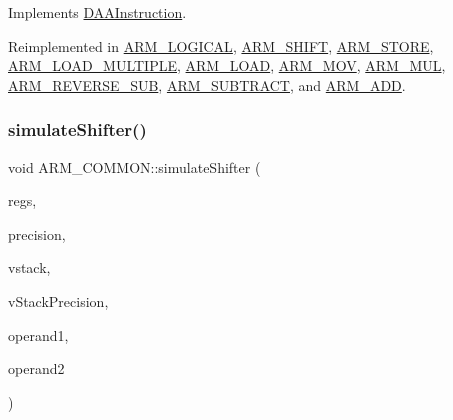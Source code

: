 Implements \hyperlink{classDAAInstruction_a61d0b9bece1e0ead89a46c0197276324}{D\+A\+A\+Instruction}.



Reimplemented in \hyperlink{classARM__LOGICAL_a6359a7daad8f3ddbe314a378e030bf1b}{A\+R\+M\+\_\+\+L\+O\+G\+I\+C\+AL}, \hyperlink{classARM__SHIFT_a0438bca8496243c4067bb1ec24abeab4}{A\+R\+M\+\_\+\+S\+H\+I\+FT}, \hyperlink{classARM__STORE_a0db5283c3bda82c617f3d2e541ad0982}{A\+R\+M\+\_\+\+S\+T\+O\+RE}, \hyperlink{classARM__LOAD__MULTIPLE_a77db594a9b9127619da39e047a12ba41}{A\+R\+M\+\_\+\+L\+O\+A\+D\+\_\+\+M\+U\+L\+T\+I\+P\+LE}, \hyperlink{classARM__LOAD_a905a6e8a6154825f9dc739cabfdb148d}{A\+R\+M\+\_\+\+L\+O\+AD}, \hyperlink{classARM__MOV_acbf1dba49a5e4d834e41d5e834ff7e5a}{A\+R\+M\+\_\+\+M\+OV}, \hyperlink{classARM__MUL_a57f827247b5ee156334e9963b3c6bfd4}{A\+R\+M\+\_\+\+M\+UL}, \hyperlink{classARM__REVERSE__SUB_a0606f63f3d08541627b5758675ca052c}{A\+R\+M\+\_\+\+R\+E\+V\+E\+R\+S\+E\+\_\+\+S\+UB}, \hyperlink{classARM__SUBTRACT_abf5d28fd7366c3310ebe6bbb9b08e26e}{A\+R\+M\+\_\+\+S\+U\+B\+T\+R\+A\+CT}, and \hyperlink{classARM__ADD_a8fd563bc37b1879fef93ee4ccbcfcafd}{A\+R\+M\+\_\+\+A\+DD}.

\mbox{\label{classARM__COMMON_a68cd9533a17558d2e508baaad0a22b9d}} 
\subsubsection{\texorpdfstring{simulate\+Shifter()}{simulateShifter()}}
{\footnotesize\ttfamily void A\+R\+M\+\_\+\+C\+O\+M\+M\+O\+N\+::simulate\+Shifter (\begin{DoxyParamCaption}\item[{\hyperlink{DAAInstruction_8h_af0fae93a861de9cf37988d5673cac523}{reg\+Table} \&}]{regs,  }\item[{\hyperlink{DAAInstruction_8h_a0e8cae02815a5f8adc750122d790b455}{reg\+Precision\+Table} \&}]{precision,  }\item[{\hyperlink{DAAInstruction_8h_a1b0e70ac1a04f06c8132055ed01f589f}{stack\+Type} \&}]{vstack,  }\item[{\hyperlink{DAAInstruction_8h_ac5cb793e9dac3fa9693da78b7e29ab30}{stack\+Prec\+Type} \&}]{v\+Stack\+Precision,  }\item[{string \&}]{operand1,  }\item[{string \&}]{operand2 }\end{DoxyParamCaption})\hspace{0.3cm}{\ttfamily [protected]}}




